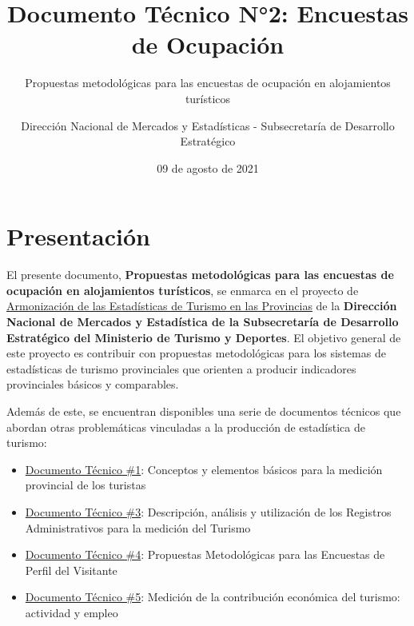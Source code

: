 \documentclass[
]{book}
\title{Documento Técnico N°2: Encuestas de Ocupación}
\subtitle{Propuestas metodológicas para las encuestas de ocupación en alojamientos turísticos}
\author{Dirección Nacional de Mercados y Estadísticas - Subsecretaría de Desarrollo Estratégico}
\date{09 de agosto de 2021}
\let\oldmaketitle\maketitle
\begin{document}
\maketitle


\newpage

\let\maketitle\oldmaketitle
\maketitle

{
\setcounter{tocdepth}{1}
\tableofcontents
}
\hypertarget{presentaciuxf3n}{%
\chapter*{Presentación}\label{presentaciuxf3n}}

El presente documento, \textbf{Propuestas metodológicas para las encuestas de ocupación en alojamientos turísticos}, se enmarca en el proyecto de \href{https://armonizacion.yvera.tur.ar//}{Armonización de las Estadísticas de Turismo en las Provincias} de la \textbf{Dirección Nacional de Mercados y Estadística de la Subsecretaría de Desarrollo Estratégico del Ministerio de Turismo y Deportes}. El objetivo general de este proyecto es contribuir con propuestas metodológicas para los sistemas de estadísticas de turismo provinciales que orienten a producir indicadores provinciales básicos y comparables.

Además de este, se encuentran disponibles una serie de documentos técnicos que abordan otras problemáticas vinculadas a la producción de estadística de turismo:

\begin{itemize}
\item
  \href{https://dnme-minturdep.github.io/DT1_medicion_turismo/}{Documento Técnico \#1}: Conceptos y elementos básicos para la medición provincial de los turistas
\item
  \href{https://dnme-minturdep.github.io/DT3_registros_adminsitrativos/}{Documento Técnico \#3}: Descripción, análisis y utilización de los Registros Administrativos para la medición del Turismo
\item
  \href{https://dnme-minturdep.github.io/DT4_perfiles/}{Documento Técnico \#4}: Propuestas Metodológicas para las Encuestas de Perfil del Visitante
\item
  \href{https://dnme-minturdep.github.io/DT5_actividad_empleo/}{Documento Técnico \#5}: Medición de la contribución económica del turismo: actividad y empleo
\end{itemize}
\end{document}
